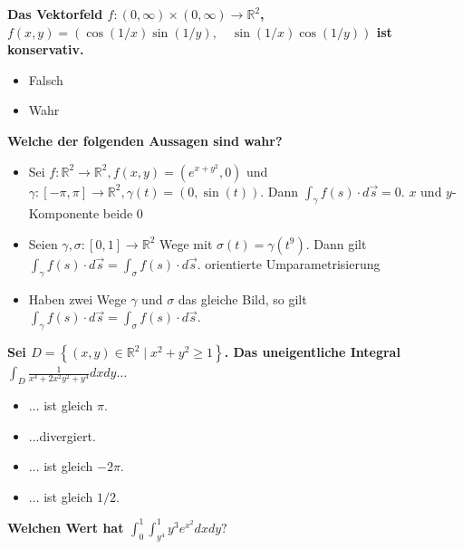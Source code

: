 \begin{flushleft}
\textbf{Das Vektorfeld $f:(0, \infty) \times(0, \infty) \rightarrow \mathbb{R}^2$,$
f(x, y)=(\cos (1 / x) \sin (1 / y), \quad \sin (1 / x) \cos (1 / y))$ ist konservativ.}



\begin{itemize}[leftmargin = *]
\item[\textcolor{green}{W}] Falsch
\item[\textcolor{red}{F}]  Wahr
\end{itemize}

\textbf{Welche der folgenden Aussagen sind wahr?}

\begin{itemize}[leftmargin = *]
\item[\textcolor{green}{W}] Sei $f: \mathbb{R}^2 \rightarrow \mathbb{R}^2, f(x, y)=\left(e^{x+y^2}, 0\right)$ und $\gamma:[-\pi, \pi] \rightarrow \mathbb{R}^2, \gamma(t)=(0, \sin (t))$. Dann $\int_\gamma f(s) \cdot d \vec{s}=0$. \textcolor{Emerald}{$x$ und $y$-Komponente beide $0$}
\item[\textcolor{green}{W}] Seien $\gamma, \sigma:[0,1] \rightarrow \mathbb{R}^2$ Wege mit $\sigma(t)=\gamma\left(t^9\right)$. Dann gilt $\int_\gamma f(s) \cdot d \vec{s}=\int_\sigma f(s) \cdot d \vec{s}$. \textcolor{Emerald}{orientierte Umparametrisierung}
\item[\textcolor{red}{F}]   Haben zwei Wege $\gamma$ und $\sigma$ das gleiche Bild, so gilt $\int_\gamma f(s) \cdot d \vec{s}=\int_\sigma f(s) \cdot d \vec{s}$.

\end{itemize}




\textbf{Sei $D=\left\{(x, y) \in \mathbb{R}^2 \mid x^2+y^2 \geq 1\right\}$. Das uneigentliche Integral$
\int_D \frac{1}{x^4+2 x^2 y^2+y^4} d x d y \ldots$
 }

\begin{itemize}[leftmargin = *]
\item[\textcolor{green}{W}] $\ldots$ ist gleich $\pi$.
\item[\textcolor{red}{F}] ...divergiert.
\item[\textcolor{red}{F}]   $\ldots$ ist gleich $-2 \pi$.
\item[\textcolor{red}{F}] $\ldots$ ist gleich $1 / 2$.
\end{itemize}


\textbf{Welchen Wert hat $\int_0^1 \int_{y^4}^1 y^3 e^{x^2} d x d y ?$
 }


\end{flushleft}
